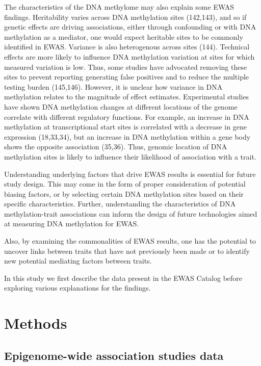 \documentclass[11pt,oneside]{bristolthesis}
\begin{document}
The characteristics of the DNA methylome may also explain some EWAS findings. Heritability varies across DNA methylation sites (142,143), and so if genetic effects are driving associations, either through confounding or with DNA methylation as a mediator, one would expect heritable sites to be commonly identified in EWAS. Variance is also heterogenous across sites (144). Technical effects are more likely to influence DNA methylation variation at sites for which measured variation is low. Thus, some studies have advocated removing these sites to prevent reporting generating false positives and to reduce the multiple testing burden (145,146). However, it is unclear how variance in DNA methylation relates to the magnitude of effect estimates. Experimental studies have shown DNA methylation changes at different locations of the genome correlate with different regulatory functions. For example, an increase in DNA methylation at transcriptional start sites is correlated with a decrease in gene expression (18,33,34), but an increase in DNA methylation within a gene body shows the opposite association (35,36). Thus, genomic location of DNA methylation sites is likely to influence their likelihood of association with a trait.

Understanding underlying factors that drive EWAS results is essential for future study design. This may come in the form of proper consideration of potential biasing factors, or by selecting certain DNA methylation sites based on their specific characteristics. Further, understanding the characteristics of DNA methylation-trait associations can inform the design of future technologies aimed at measuring DNA methylation for EWAS.

Also, by examining the commonalities of EWAS results, one has the potential to uncover links between traits that have not previously been made or to identify new potential mediating factors between traits.

In this study we first describe the data present in the EWAS Catalog before exploring various explanations for the findings.

\newpage

\hypertarget{methods-04}{%
\section{Methods}\label{methods-04}}

\hypertarget{epigenome-wide-association-studies-data}{%
\subsection{Epigenome-wide association studies data}\label{epigenome-wide-association-studies-data}}
\end{document}
